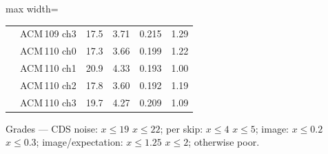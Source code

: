 \begin{table}[H]
\begin{adjustbox}{max width=\linewidth}
\begin{tabular}{llrrrr}
 & ACM\,109 ch3 & \cellcolor{good}17.5 & \cellcolor{good}3.71 & \cellcolor{fair}0.215 & \cellcolor{fair}1.29\\
 & ACM\,110 ch0 & \cellcolor{good}17.3 & \cellcolor{good}3.66 & \cellcolor{good}0.199 & \cellcolor{good}1.22\\
 & ACM\,110 ch1 & \cellcolor{fair}20.9 & \cellcolor{fair}4.33 & \cellcolor{good}0.193 & \cellcolor{good}1.00\\
 & ACM\,110 ch2 & \cellcolor{good}17.8 & \cellcolor{good}3.60 & \cellcolor{good}0.192 & \cellcolor{good}1.19\\
 & ACM\,110 ch3 & \cellcolor{fair}19.7 & \cellcolor{fair}4.27 & \cellcolor{fair}0.209 & \cellcolor{good}1.09\\
\bottomrule\end{tabular}\end{adjustbox}
\par\smallskip\footnotesize Grades --- CDS noise: \colorbox{good}{$x\le19$} \colorbox{fair}{$x\le22$}; per skip: \colorbox{good}{$x\le4$} \colorbox{fair}{$x\le5$}; image: \colorbox{good}{$x\le0.2$} \colorbox{fair}{$x\le0.3$}; image/expectation: \colorbox{good}{$x\le1.25$} \colorbox{fair}{$x\le2$}; otherwise \colorbox{poor}{poor}.
\end{table}

